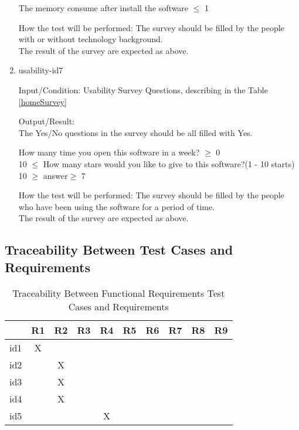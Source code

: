 \documentclass[12pt, titlepage]{article}
\begin{document}
\begin{enumerate}
The memory consume after install the software $\leq$ 1 %

How the test will be performed:
The survey should be filled by the people with or without technology background. \\
The result of the survey are expected as above.

\item{usability-id7\\}

Input/Condition: Usability Survey Questions, describing in the Table \ref{homeSurvey}

Output/Result: \\
The Yes/No questions in the survey should be all filled with Yes.

How many time you open this software in a week? $\geq$ 0\\

10 $\leq$ How many stars  would you like to give to this software?(1 - 10 starts) 10 $\geq$ answer$\geq$ 7

How the test will be performed:
The survey should be filled by the people who have been using the software for a period of time. \\
The result of the survey are expected as above.

\end{enumerate}




\newpage
\subsection{Traceability Between Test Cases and Requirements}


\begin{table}[h!]
\centering
\begin{tabular}{|c|c|c|c|c|c|c|c|c|c|}
\hline        
	& R1& R2 & R3 &R4 & R5 &R6  &R7 &R8 &R9 \\
\hline
id1        & X &    &     &    &    &    &   &    &    \\ \hline
id2        &    & X &     &    &    &    &   &    &     \\ \hline
id3        &     & X &     &    &    &    &   &    &    \\ \hline
id4        &     & X &     &    &    &    &   &    &      \\ \hline
id5        &    &    &     & X &    &    &   &    &     \\  \hline


\hline
\end{tabular}
\caption{Traceability Between Functional Requirements Test Cases and
Requirements}
\label{Table:Rtrace}
\end{table}
\end{document}
